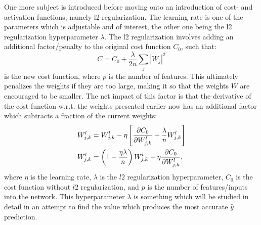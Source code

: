            One more subject is introduced before moving onto an introduction of cost- and activation functions, namely l2 regularization. The learning rate is one of the parameters which is adjustable and of interest, the other one being the l2 regularization hyperparameter $\lambda$. The l2 regularization involves adding an additional factor/penalty to the original cost function $C_0$, such that:
            \begin{equation}
                C = C_0 + \frac{\lambda}{2n} \sum_j |W_j|^2
            \end{equation}
            is the new cost function, where $p$ is the number of features. This ultimately penalizes the weights if they are too large, making it so that the weights $W$ are encouraged to be smaller. The net impact of this factor is that the derivative of the cost function w.r.t. the weights presented earlier now has an additional factor which subtracts a fraction of the current weights:
            \begin{align}
                W^l_{j,k} &= W^l_{j,k} - \eta\left[ \pdv{C_0}{W^l_{j,k}} + \frac{\lambda}{n} W^l_{j,k} \right]\\
                W^l_{j,k} &= \left(1-\frac{\eta\lambda}{n}\right)W^l_{j,k} - \eta \pdv{C_0}{W^l_{j,k}},
            \end{align}
            where $\eta$ is the learning rate, $\lambda$ is the $l2$ regularization hyperparameter, $C_0$ is the cost function without $l2$ regularization, and $p$ is the number of features/inputs into the network. This hyperparameter $\lambda$ is something which will be studied in detail in an attempt to find the value which produces the most accurate $\hat{y}$ prediction.
            
